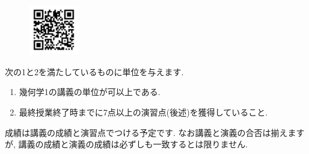 \documentclass[dvipdfmx,a4paper,11pt]{article}
\theoremstyle{definition}
\begin{document}
\begin{figure}[htbp]
\begin{center}
 \includegraphics[height=22mm, width=22mm]{set.png}
\end{center}
\end{figure}

次の1と2を満たしているものに単位を与えます.
\begin{enumerate}
  \setlength{\parskip}{0cm} %
  \setlength{\itemsep}{0cm} %
\item 幾何学1の講義の単位が可以上である.
\item 最終授業終了時までに7点以上の演習点(後述)を獲得していること.
\end{enumerate}
成績は講義の成績と演習点でつける予定です.
なお講義と演義の合否は揃えますが, 講義の成績と演義の成績は必ずしも一致するとは限りません. 
\end{document}
